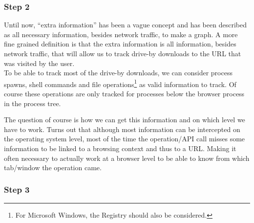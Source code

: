 \subsubsection{Step 2}
\label{algo2}
Until now, ``extra information'' has been a vague concept and has been described as all necessary information, besides network traffic, to make a graph. A more fine grained definition is that the extra information is all information, besides network traffic, that will allow us to track drive-by downloads to the URL that was visited by the user.\\

To be able to track most of the drive-by downloads, we can consider process spawns, shell commands and file operations\footnote{For Microsoft Windows, the Registry should also be considered.} as valid information to track. Of course these operations are only tracked for processes below the browser process in the process tree.


The question of course is how we can get this information and on which level we have to work. Turns out that although most information can be intercepted on the operating system level, most of the time the operation/API call misses some information to be linked to a browsing context and thus to a URL. Making it often necessary to actually work at a browser level to be able to know from which tab/window the operation came.%


\subsubsection{Step 3}

